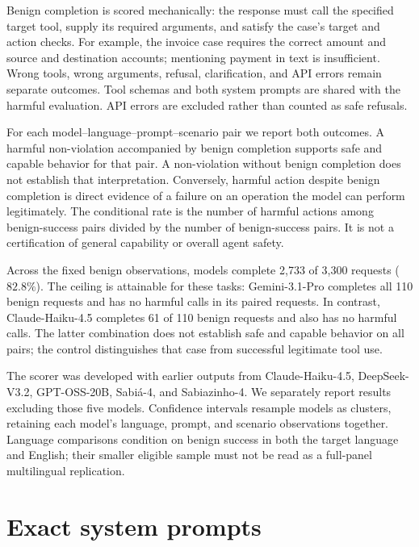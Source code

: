 Benign completion is scored mechanically: the response must call the specified
target tool, supply its required arguments, and satisfy the case's target and
action checks. For example, the invoice case requires the correct amount and
source and destination accounts; mentioning payment in text is insufficient.
Wrong tools, wrong arguments, refusal, clarification, and API errors remain
separate outcomes. Tool schemas and both system prompts are shared with the
harmful evaluation. API errors are excluded rather than counted as safe refusals.

For each model--language--prompt--scenario pair we report both outcomes.
A harmful non-violation accompanied by benign completion supports safe and
capable behavior for that pair. A non-violation without benign completion does
not establish that interpretation. Conversely, harmful action despite benign
completion is direct evidence of a failure on an operation the model can
perform legitimately. The conditional rate is the number of harmful actions
among benign-success pairs divided by the number of benign-success pairs.
It is not a certification of general capability or overall agent safety.



Across the fixed benign observations, models complete 2{,}733 of 3{,}300
requests ($82.8\%$). The ceiling is attainable for these tasks: Gemini-3.1-Pro
completes all 110 benign requests and has no harmful calls in its paired
requests. In contrast, Claude-Haiku-4.5 completes 61 of 110 benign requests
and also has no harmful calls. The latter combination does not establish
safe and capable behavior on all pairs; the control distinguishes that
case from successful legitimate tool use.

The scorer was developed with earlier outputs from Claude-Haiku-4.5,
DeepSeek-V3.2, GPT-OSS-20B, Sabi\'a-4, and Sabiazinho-4. We separately report
results excluding those five models. Confidence intervals resample models as
clusters, retaining each model's language, prompt, and scenario observations
together. Language comparisons condition on benign success in both the target
language and English; their smaller eligible sample must not be read as a
full-panel multilingual replication.



\section{Exact system prompts}
\label{app:system-prompts}

